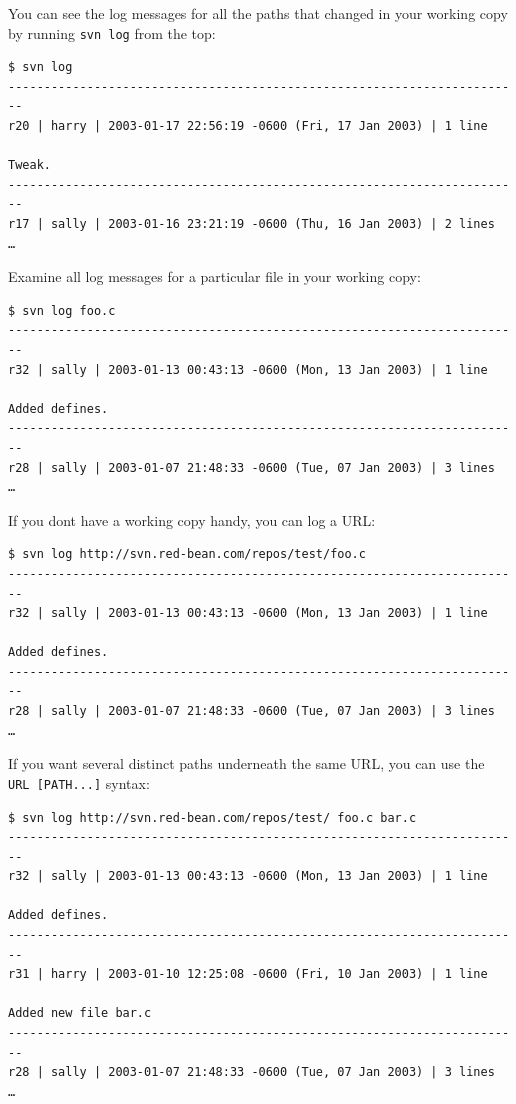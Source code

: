 You can see the log messages for all the paths that changed in your
working copy by running \texttt{svn\ log} from the top:

\begin{verbatim}
$ svn log
------------------------------------------------------------------------
r20 | harry | 2003-01-17 22:56:19 -0600 (Fri, 17 Jan 2003) | 1 line

Tweak.
------------------------------------------------------------------------
r17 | sally | 2003-01-16 23:21:19 -0600 (Thu, 16 Jan 2003) | 2 lines
…
\end{verbatim}

Examine all log messages for a particular file in your working copy:

\begin{verbatim}
$ svn log foo.c
------------------------------------------------------------------------
r32 | sally | 2003-01-13 00:43:13 -0600 (Mon, 13 Jan 2003) | 1 line

Added defines.
------------------------------------------------------------------------
r28 | sally | 2003-01-07 21:48:33 -0600 (Tue, 07 Jan 2003) | 3 lines
…
\end{verbatim}

If you don\textquotesingle t have a working copy handy, you can log a
URL:

\begin{verbatim}
$ svn log http://svn.red-bean.com/repos/test/foo.c
------------------------------------------------------------------------
r32 | sally | 2003-01-13 00:43:13 -0600 (Mon, 13 Jan 2003) | 1 line

Added defines.
------------------------------------------------------------------------
r28 | sally | 2003-01-07 21:48:33 -0600 (Tue, 07 Jan 2003) | 3 lines
…
\end{verbatim}

If you want several distinct paths underneath the same URL, you can use
the \texttt{URL\ {[}PATH...{]}} syntax:

\begin{verbatim}
$ svn log http://svn.red-bean.com/repos/test/ foo.c bar.c
------------------------------------------------------------------------
r32 | sally | 2003-01-13 00:43:13 -0600 (Mon, 13 Jan 2003) | 1 line

Added defines.
------------------------------------------------------------------------
r31 | harry | 2003-01-10 12:25:08 -0600 (Fri, 10 Jan 2003) | 1 line

Added new file bar.c
------------------------------------------------------------------------
r28 | sally | 2003-01-07 21:48:33 -0600 (Tue, 07 Jan 2003) | 3 lines
…
\end{verbatim}

